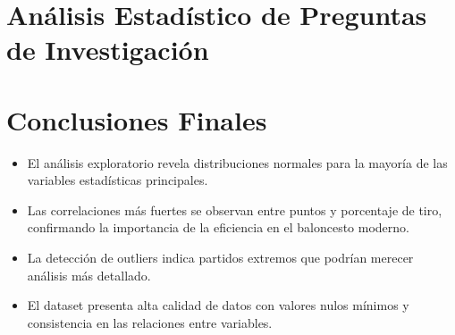 \documentclass[12pt]{article}
\begin{document}
\section{Análisis Estadístico de Preguntas de Investigación}






\section*{Conclusiones Finales}

\begin{itemize}
\item El análisis exploratorio revela distribuciones normales para la mayoría de las variables estadísticas principales.
\item Las correlaciones más fuertes se observan entre puntos y porcentaje de tiro, confirmando la importancia de la eficiencia en el baloncesto moderno.
\item La detección de outliers indica partidos extremos que podrían merecer análisis más detallado.
\item El dataset presenta alta calidad de datos con valores nulos mínimos y consistencia en las relaciones entre variables.
\end{itemize}
\end{document}
